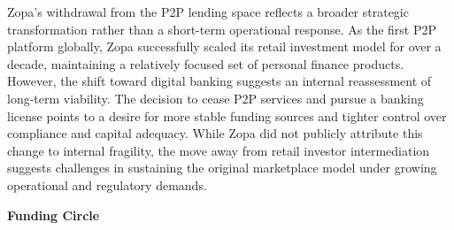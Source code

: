 \documentclass[pdflatex,sn-apa]{sn-jnl}%
\theoremstyle{thmstyleone}%
\theoremstyle{thmstyletwo}%
\theoremstyle{thmstylethree}%
\begin{document}
Zopa's withdrawal from the P2P lending space reflects a broader strategic transformation rather than a short-term operational response. As the first P2P platform globally, Zopa successfully scaled its retail investment model for over a decade, maintaining a relatively focused set of personal finance products. However, the shift toward digital banking suggests an internal reassessment of long-term viability. The decision to cease P2P services and pursue a banking license points to a desire for more stable funding sources and tighter control over compliance and capital adequacy. While Zopa did not publicly attribute this change to internal fragility, the move away from retail investor intermediation suggests challenges in sustaining the original marketplace model under growing operational and regulatory demands.

\vspace{1\baselineskip}
\textbf{Funding Circle}
\end{document}
